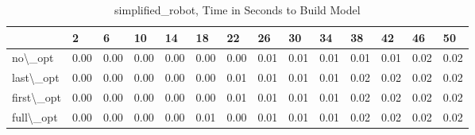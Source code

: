 \begin{table}
\centering
\caption{simplified\_robot, Time in Seconds to Build Model}
\label{simplified_robot_model_time}
\begin{tabular}{llllllllllllll}
\toprule
{} &     2 &     6 &    10 &    14 &    18 &    22 &    26 &    30 &    34 &    38 &    42 &    46 &    50 \\
\midrule
no\textbackslash \_opt    &  0.00 &  0.00 &  0.00 &  0.00 &  0.00 &  0.00 &  0.01 &  0.01 &  0.01 &  0.01 &  0.01 &  0.02 &  0.02 \\
last\textbackslash \_opt  &  0.00 &  0.00 &  0.00 &  0.00 &  0.00 &  0.01 &  0.01 &  0.01 &  0.01 &  0.02 &  0.02 &  0.02 &  0.02 \\
first\textbackslash \_opt &  0.00 &  0.00 &  0.00 &  0.00 &  0.00 &  0.01 &  0.01 &  0.01 &  0.01 &  0.02 &  0.02 &  0.02 &  0.02 \\
full\textbackslash \_opt  &  0.00 &  0.00 &  0.00 &  0.00 &  0.01 &  0.00 &  0.01 &  0.01 &  0.01 &  0.02 &  0.02 &  0.02 &  0.02 \\
\bottomrule
\end{tabular}
\end{table}

